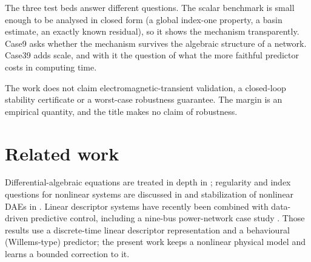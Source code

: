 \documentclass[preprint,12pt]{elsarticle}
\begin{document}
The three test beds answer different questions. The scalar benchmark is small enough to be analysed in closed form (a global index-one property, a basin estimate, an exactly known residual), so it shows the mechanism transparently. Case9 asks whether the mechanism survives the algebraic structure of a network. Case39 adds scale, and with it the question of what the more faithful predictor costs in computing time.

The work does not claim electromagnetic-transient validation, a closed-loop stability certificate or a worst-case robustness guarantee. The margin is an empirical quantity, and the title makes no claim of robustness.

\section{Related work}
\label{sec:related}
Differential-algebraic equations are treated in depth in \cite{brenan,kunkel}; regularity and index questions for nonlinear systems are discussed in \cite{scholz} and stabilization of nonlinear DAEs in \cite{liuho}. Linear descriptor systems have recently been combined with data-driven predictive control, including a nine-bus power-network case study \cite{schmitz1,schmitz2}. Those results use a discrete-time linear descriptor representation and a behavioural (Willems-type) predictor; the present work keeps a nonlinear physical model and learns a bounded correction to it.
\end{document}
